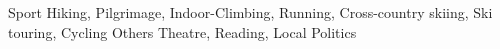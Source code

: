 \begin{cvskills}

  \cvskill
    {Sport} %
    {Hiking, Pilgrimage, Indoor-Climbing, Running, Cross-country skiing, Ski touring, Cycling} 
  \cvskill
    {Others} %
    {Theatre, Reading, Local Politics} 
    

\end{cvskills}

